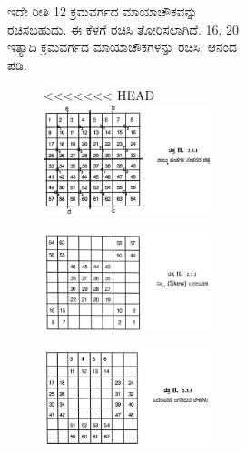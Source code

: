 \begin{figure}[H]
\begin{figure}[H]
\begin{figure}[h]
ಇದೇ ರೀತಿ 12 ಕ್ರಮವರ್ಗದ ಮಾಯಾಚೌಕವನ್ನು ರಚಿಸಬಹುದು. ಈ ಕೆಳಗೆ ರಚಿಸಿ ತೋರಿಸಲಾಗಿದೆ. 16, 20 ಇತ್ಯಾದಿ ಕ್ರಮವರ್ಗದ ಮಾಯಾಚೌಕಗಳನ್ನು ರಚಿಸಿ, ಆನಂದ ಪಡಿ.
\begin{figure}[H]
<<<<<<< HEAD
\includegraphics[scale=.9]{src/figures/chap3/fig3-24.jpg}
\end{figure}
\begin{figure}[H]
\includegraphics[scale=.85]{src/figures/chap3/fig3-25.jpg}
\end{figure}
\begin{figure}[H]
\includegraphics[scale=.9]{src/figures/chap3/fig3-26.jpg}

\end{figure}
\end{figure}
\end{figure}
\end{figure}
